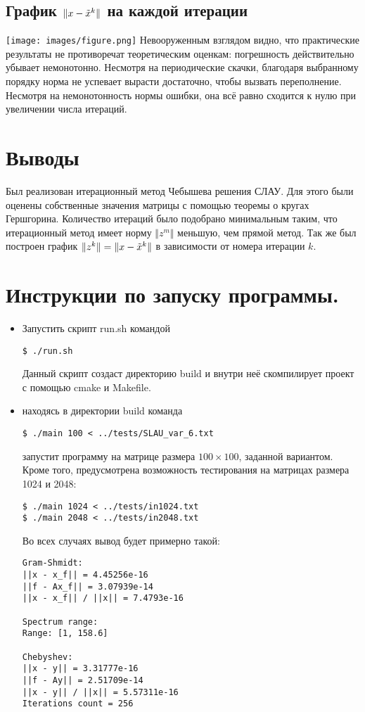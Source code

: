 \documentclass[a4paper,12pt,titlepage,final]{article}
\begin{document}
\subsection{График $\Vert x - \Tilde{x}^k \Vert$ на каждой итерации}

\hspace{-3.3cm}
\texttt{[image: images/figure.png]}
Невооруженным взглядом видно, что практические результаты не противоречат теоретическим оценкам: погрешность действительно убывает немонотонно. Несмотря на периодические скачки, благодаря выбранному порядку норма не успевает вырасти достаточно, чтобы вызвать переполнение. Несмотря на немонотонность нормы ошибки, она всё равно сходится к нулю при увеличении числа итераций.
\section{Выводы}
Был реализован итерационный метод Чебышева решения СЛАУ. Для этого были оценены собственные значения матрицы с помощью теоремы о кругах Гершгорина. Количество итераций было подобрано минимальным таким, что итерационный метод имеет норму $\Vert z^m \Vert$ меньшую, чем прямой метод. Так же был построен график $\Vert z^k \Vert = \Vert x - \Tilde{x}^k \Vert$ в зависимости от номера итерации $k$.
\section{Инструкции по запуску программы.}
\begin{itemize}
    \item Запустить скрипт run.sh командой 
\begin{lstlisting}
$ ./run.sh 
\end{lstlisting} 
Данный скрипт создаст директорию build и внутри неё скомпилирует проект с помощью cmake и Makefile. 
    \item находясь в директории build команда 
\begin{lstlisting}
$ ./main 100 < ../tests/SLAU_var_6.txt
\end{lstlisting} 
    запустит программу на матрице размера $100 \times 100$, заданной вариантом. Кроме того, предусмотрена возможность тестирования на матрицах размера 1024 и 2048:
\begin{lstlisting}
$ ./main 1024 < ../tests/in1024.txt
$ ./main 2048 < ../tests/in2048.txt
\end{lstlisting} 
Во всех случаях вывод будет примерно такой:
\begin{lstlisting}
Gram-Shmidt:
||x - x_f|| = 4.45256e-16
||f - Ax_f|| = 3.07939e-14
||x - x_f|| / ||x|| = 7.4793e-16

Spectrum range:
Range: [1, 158.6]

Chebyshev:
||x - y|| = 3.31777e-16
||f - Ay|| = 2.51709e-14
||x - y|| / ||x|| = 5.57311e-16
Iterations count = 256
\end{lstlisting}
\end{itemize}
\end{document}
